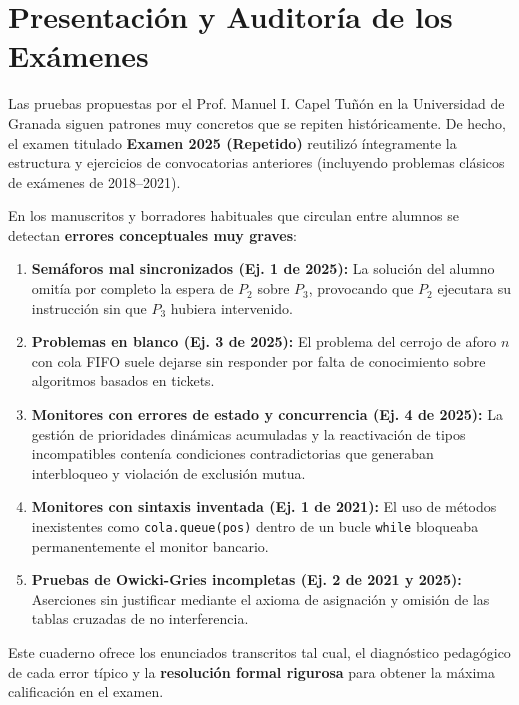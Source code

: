 \documentclass[11pt,a4paper,twoside,openright]{report}
\begin{document}
\chapter*{Presentación y Auditoría de los Exámenes}

\begin{aviso}
Las pruebas propuestas por el Prof. Manuel I. Capel Tuñón en la Universidad de Granada siguen patrones muy concretos que se repiten históricamente. De hecho, el examen titulado \textbf{Examen 2025 (Repetido)} reutilizó íntegramente la estructura y ejercicios de convocatorias anteriores (incluyendo problemas clásicos de exámenes de 2018--2021).

En los manuscritos y borradores habituales que circulan entre alumnos se detectan \textbf{errores conceptuales muy graves}:
\begin{enumerate}[leftmargin=*]
    \item \textbf{Semáforos mal sincronizados (Ej. 1 de 2025):} La solución del alumno omitía por completo la espera de $P_2$ sobre $P_3$, provocando que $P_2$ ejecutara su instrucción sin que $P_3$ hubiera intervenido.
    \item \textbf{Problemas en blanco (Ej. 3 de 2025):} El problema del cerrojo de aforo $n$ con cola FIFO suele dejarse sin responder por falta de conocimiento sobre algoritmos basados en tickets.
    \item \textbf{Monitores con errores de estado y concurrencia (Ej. 4 de 2025):} La gestión de prioridades dinámicas acumuladas y la reactivación de tipos incompatibles contenía condiciones contradictorias que generaban interbloqueo y violación de exclusión mutua.
    \item \textbf{Monitores con sintaxis inventada (Ej. 1 de 2021):} El uso de métodos inexistentes como \texttt{cola.queue(pos)} dentro de un bucle \texttt{while} bloqueaba permanentemente el monitor bancario.
    \item \textbf{Pruebas de Owicki-Gries incompletas (Ej. 2 de 2021 y 2025):} Aserciones sin justificar mediante el axioma de asignación y omisión de las tablas cruzadas de no interferencia.
\end{enumerate}

Este cuaderno ofrece los enunciados transcritos tal cual, el diagnóstico pedagógico de cada error típico y la \textbf{resolución formal rigurosa} para obtener la máxima calificación en el examen.
\end{aviso}
\end{document}
